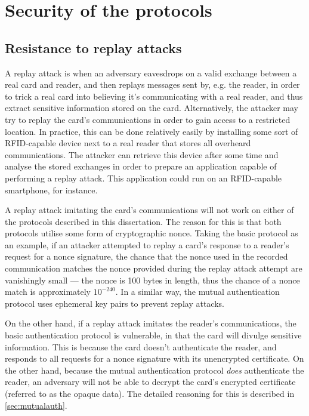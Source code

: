 \documentclass[12pt,a4paper,twoside,openright]{report}
\begin{document}
\section{Security of the protocols}

\subsection{Resistance to replay attacks}

A replay attack is when an adversary eavesdrops on a valid exchange between a real card and reader, and then replays messages sent by, e.g. the reader, in order to trick a real card into believing it's communicating with a real reader, and thus extract sensitive information stored on the card. Alternatively, the attacker may try to replay the card's communications in order to gain access to a restricted location. In practice, this can be done relatively easily by installing some sort of RFID-capable device next to a real reader that stores all overheard communications. The attacker can retrieve this device after some time and analyse the stored exchanges in order to prepare an application capable of performing a replay attack. This application could run on an RFID-capable smartphone, for instance.

A replay attack imitating the card's communications will not work on either of the protocols described in this dissertation. The reason for this is that both protocols utilise some form of cryptographic nonce. Taking the basic protocol as an example, if an attacker attempted to replay a card's response to a reader's request for a nonce signature, the chance that the nonce used in the recorded communication matches the nonce provided during the replay attack attempt are vanishingly small --- the nonce is 100 bytes in length, thus the chance of a nonce match is approximately $10^{-240}$. In a similar way, the mutual authentication protocol uses ephemeral key pairs to prevent replay attacks.

On the other hand, if a replay attack imitates the reader's communications, the basic authentication protocol is vulnerable, in that the card will divulge sensitive information. This is because the card doesn't authenticate the reader, and responds to all requests for a nonce signature with its unencrypted certificate. On the other hand, because the mutual authentication protocol \emph{does} authenticate the reader, an adversary will not be able to decrypt the card's encrypted certificate (referred to as the opaque data). The detailed reasoning for this is described in \autoref{sec:mutualauth}.
\end{document}
